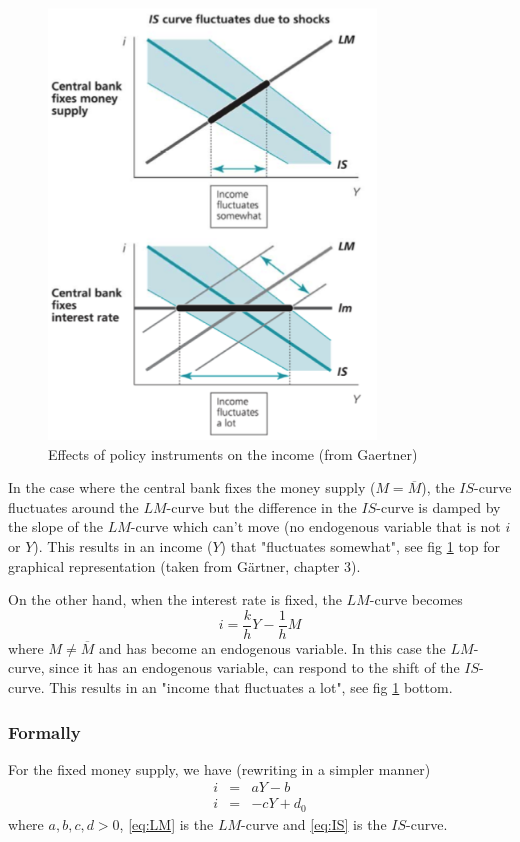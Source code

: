 \documentclass[a4paper] {scrartcl}
\begin{document}
\begin{figure}[htbp]
	\centering
		\includegraphics[height=4.5in]{fluc.png}
	\caption{Effects of policy instruments on the income (from Gaertner)}
	\label{fig:fluc}
\end{figure}

In the case where the central bank fixes the money supply ($M=\overline M$), the $IS$-curve fluctuates around the $LM$-curve but the difference in the $IS$-curve is damped by the slope of the $LM$-curve which can't move (no endogenous variable that is not $i$ or $Y$). This results in an income ($Y$) that "fluctuates somewhat", see fig \ref{fig:fluc} top for graphical representation (taken from Gärtner, chapter 3).

On the other hand, when the interest rate is fixed, the $LM$-curve becomes
\begin{equation}
	i = \frac{k}{h}Y-\frac{1}{h}M
\end{equation}
where $M\neq\overline M$ and has become an endogenous variable. In this case the $LM$-curve, since it has an endogenous variable, can respond to the shift of the $IS$-curve. This results in an "income that fluctuates a lot", see fig \ref{fig:fluc} bottom.

\subsubsection{Formally}


For the fixed money supply, we have (rewriting in a simpler manner)
\begin{eqnarray}
	i&=& 
	aY  -b\label{eq:LM}\\
	i&=& -cY+d_0\label{eq:IS}
\end{eqnarray}
where $a,b,c,d>0$, \ref{eq:LM} is the $LM$-curve
and \ref{eq:IS} is the $IS$-curve. 
\end{document}
